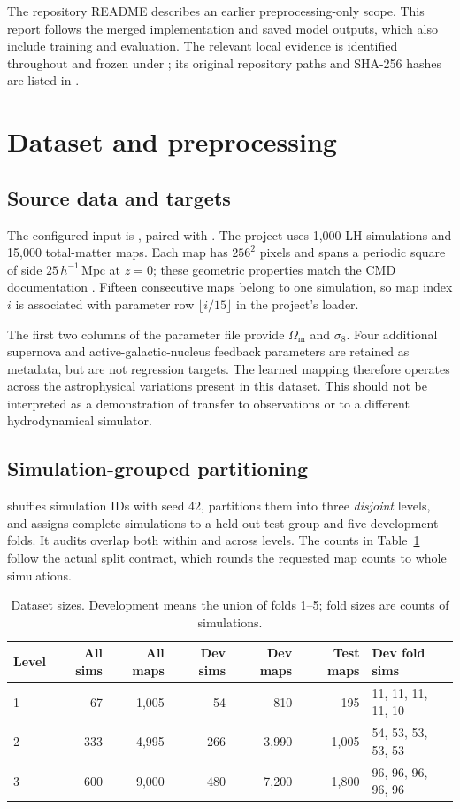 \documentclass[11pt,a4paper]{article}
\newcommand{\Om}{\Omega_{\mathrm m}}
\newcommand{\sig}{\sigma_8}
\begin{document}
The repository README describes an earlier preprocessing-only scope. This report follows the merged implementation and saved model outputs, which also include training and evaluation. The relevant local evidence is identified throughout and frozen under ; its original repository paths and SHA-256 hashes are listed in  \cite{repo}.

\section{Dataset and preprocessing}
\subsection{Source data and targets}
The configured input is , paired with . The project uses 1,000 LH simulations and 15,000 total-matter maps. Each map has $256^2$ pixels and spans a periodic square of side $25\,h^{-1}\,\mathrm{Mpc}$ at $z=0$; these geometric properties match the CMD documentation \cite{docs}. Fifteen consecutive maps belong to one simulation, so map index $i$ is associated with parameter row $\lfloor i/15\rfloor$ in the project's loader.

The first two columns of the parameter file provide $\Om$ and $\sig$. Four additional supernova and active-galactic-nucleus feedback parameters are retained as metadata, but are not regression targets. The learned mapping therefore operates across the astrophysical variations present in this dataset. This should not be interpreted as a demonstration of transfer to observations or to a different hydrodynamical simulator.

\subsection{Simulation-grouped partitioning}
 shuffles simulation IDs with seed 42, partitions them into three \emph{disjoint} levels, and assigns complete simulations to a held-out test group and five development folds. It audits overlap both within and across levels. The counts in Table~\ref{tab:splits} follow the actual split contract, which rounds the requested map counts to whole simulations.

\begin{table}[htbp]\centering\small
\caption{Dataset sizes. Development means the union of folds 1--5; fold sizes are counts of simulations.}\label{tab:splits}
\begin{tabular}{lrrrrrl}
\toprule
Level & All sims & All maps & Dev sims & Dev maps & Test maps & Dev fold sims\\
\midrule
1 & 67 & 1,005 & 54 & 810 & 195 & 11, 11, 11, 11, 10\\
2 & 333 & 4,995 & 266 & 3,990 & 1,005 & 54, 53, 53, 53, 53\\
3 & 600 & 9,000 & 480 & 7,200 & 1,800 & 96, 96, 96, 96, 96\\
\bottomrule
\end{tabular}
\end{table}
\end{document}
